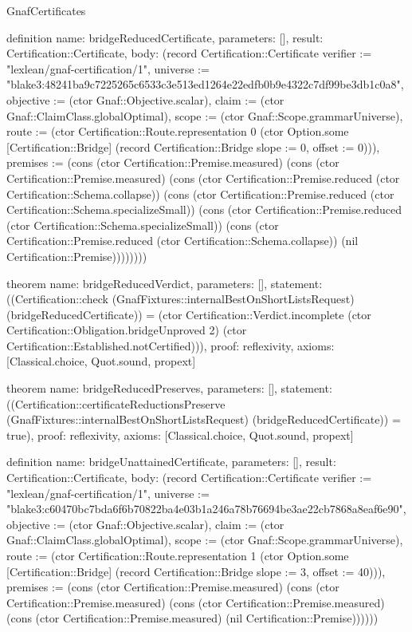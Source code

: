 \begin{lexlean}{GnafCertificates}
\begin{semanticmodule}
definition{
  name: bridgeReducedCertificate,
  parameters: [],
  result: Certification::Certificate,
  body: (record Certification::Certificate {verifier := "lexlean/gnaf-certification/1", universe := "blake3:48241ba9c7225265c6533c3e513ed1264e22edfb0b9e4322c7df99be3db1c0a8", objective := (ctor Gnaf::Objective.scalar), claim := (ctor Gnaf::ClaimClass.globalOptimal), scope := (ctor Gnaf::Scope.grammarUniverse), route := (ctor Certification::Route.representation 0 (ctor Option.some [Certification::Bridge] (record Certification::Bridge {slope := 0, offset := 0}))), premises := (cons (ctor Certification::Premise.measured) (cons (ctor Certification::Premise.measured) (cons (ctor Certification::Premise.reduced (ctor Certification::Schema.collapse)) (cons (ctor Certification::Premise.reduced (ctor Certification::Schema.specializeSmall)) (cons (ctor Certification::Premise.reduced (ctor Certification::Schema.specializeSmall)) (cons (ctor Certification::Premise.reduced (ctor Certification::Schema.collapse)) (nil Certification::Premise)))))))})
}

theorem{
  name: bridgeReducedVerdict,
  parameters: [],
  statement: ((Certification::check (GnafFixtures::internalBestOnShortListsRequest) (bridgeReducedCertificate)) = (ctor Certification::Verdict.incomplete (ctor Certification::Obligation.bridgeUnproved 2) (ctor Certification::Established.notCertified))),
  proof: reflexivity{},
  axioms: [Classical.choice, Quot.sound, propext]
}

theorem{
  name: bridgeReducedPreserves,
  parameters: [],
  statement: ((Certification::certificateReductionsPreserve (GnafFixtures::internalBestOnShortListsRequest) (bridgeReducedCertificate)) = true),
  proof: reflexivity{},
  axioms: [Classical.choice, Quot.sound, propext]
}

definition{
  name: bridgeUnattainedCertificate,
  parameters: [],
  result: Certification::Certificate,
  body: (record Certification::Certificate {verifier := "lexlean/gnaf-certification/1", universe := "blake3:c60470bc7bda6f6b70822ba4e03b1a246a78b76694be3ae22cb7868a8eaf6e90", objective := (ctor Gnaf::Objective.scalar), claim := (ctor Gnaf::ClaimClass.globalOptimal), scope := (ctor Gnaf::Scope.grammarUniverse), route := (ctor Certification::Route.representation 1 (ctor Option.some [Certification::Bridge] (record Certification::Bridge {slope := 3, offset := 40}))), premises := (cons (ctor Certification::Premise.measured) (cons (ctor Certification::Premise.measured) (cons (ctor Certification::Premise.measured) (cons (ctor Certification::Premise.measured) (nil Certification::Premise)))))})
}


\end{semanticmodule}
\end{lexlean}
